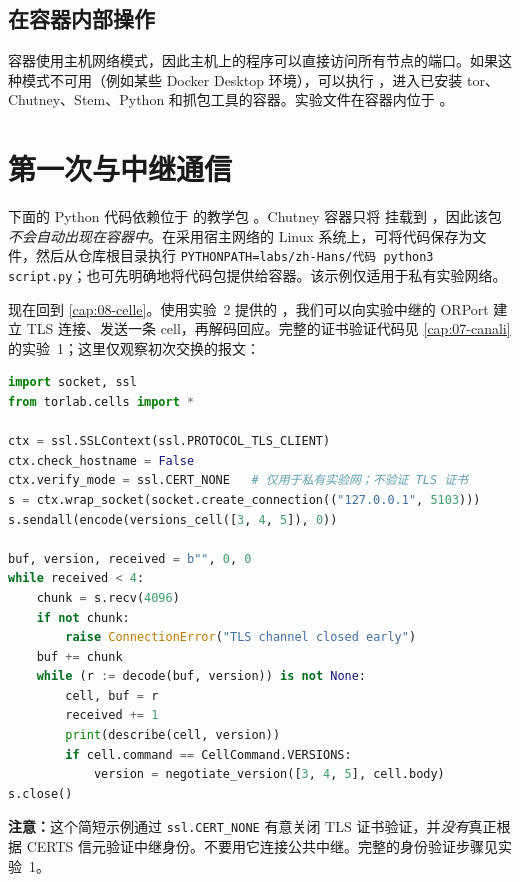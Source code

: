 \subsection{在容器内部操作}\label{sec:rp-shell}

容器使用主机网络模式，因此主机上的程序可以直接访问所有节点的端口。如果这种模式不可用（例如某些 Docker Desktop 环境），可以执行 ，进入已安装 tor、Chutney、Stem、Python 和抓包工具的容器。实验文件在容器内位于 。

\section{第一次与中继通信}\label{sec:rp-contatto}

下面的 Python 代码依赖位于  的教学包 。Chutney 容器只将  挂载到 ，因此该包\emph{不会自动出现在容器中}。在采用宿主网络的 Linux 系统上，可将代码保存为文件，然后从仓库根目录执行 \texttt{PYTHONPATH=labs/zh-Hans/代码 python3 script.py}；也可先明确地将代码包提供给容器。该示例仅适用于私有实验网络。

现在回到 \cref{cap:08-celle}。使用实验~2 提供的 ，我们可以向实验中继的 ORPort 建立 TLS 连接、发送一条  cell，再解码回应。完整的证书验证代码见 \cref{cap:07-canali} 的实验~1；这里仅观察初次交换的报文：
\begin{lstlisting}[language=Python]
import socket, ssl
from torlab.cells import *

ctx = ssl.SSLContext(ssl.PROTOCOL_TLS_CLIENT)
ctx.check_hostname = False
ctx.verify_mode = ssl.CERT_NONE   # 仅用于私有实验网；不验证 TLS 证书
s = ctx.wrap_socket(socket.create_connection(("127.0.0.1", 5103)))
s.sendall(encode(versions_cell([3, 4, 5]), 0))

buf, version, received = b"", 0, 0
while received < 4:
    chunk = s.recv(4096)
    if not chunk:
        raise ConnectionError("TLS channel closed early")
    buf += chunk
    while (r := decode(buf, version)) is not None:
        cell, buf = r
        received += 1
        print(describe(cell, version))
        if cell.command == CellCommand.VERSIONS:
            version = negotiate_version([3, 4, 5], cell.body)
s.close()
\end{lstlisting}

\textbf{注意：}这个简短示例通过 \texttt{ssl.CERT\_NONE} 有意关闭 TLS 证书验证，并\emph{没有}真正根据 CERTS 信元验证中继身份。不要用它连接公共中继。完整的身份验证步骤见实验~1。

